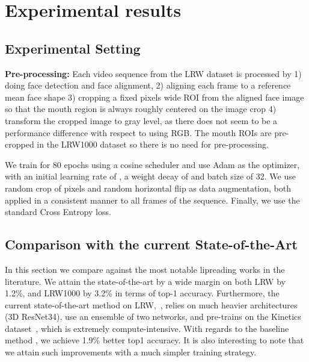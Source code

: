 \documentclass{article}
\begin{document}
\section{Experimental results}
\label{sec:experiments}



\subsection{Experimental Setting}

\textbf{Pre-processing:} Each video sequence from the LRW dataset is processed by 1) doing face detection and face alignment, 2) aligning each frame to a reference mean face shape 3) cropping a fixed  pixels wide ROI from the aligned face image so that the mouth region is always roughly centered on the image crop 4) transform the cropped image to gray level, as there does not seem to be a performance difference with respect to using RGB. The mouth ROIs are pre-cropped in the LRW1000 dataset so there is no need for pre-processing.

We train for 80 epochs using a cosine scheduler and use Adam as the optimizer, with an initial learning rate of , a weight decay of  and batch size of 32. We use random crop of  pixels and random horizontal flip as data augmentation, both applied in a consistent manner to all frames of the sequence. Finally, we use the standard Cross Entropy loss.






\subsection{Comparison with the current State-of-the-Art}

In this section we compare against the most notable lipreading works in the literature. We attain the state-of-the-art by a wide margin on both LRW by 1.2\%, and LRW1000 by 3.2\% in terms of top-1 accuracy. Furthermore, the current state-of-the-art method on LRW,~\cite{weng19}, relies on much heavier architectures (3D ResNet34), use an ensemble of two networks, and pre-trains on the Kinetics dataset~\cite{kinetics17}, which is extremely compute-intensive. With regards to the baseline method \cite{petridis18}, we achieve 1.9\% better top1 accuracy.
It is also interesting to note that we attain such improvements with a much simpler training strategy.
\end{document}
